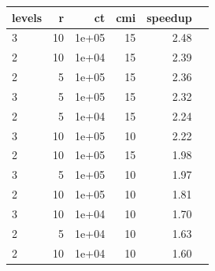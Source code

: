 \begin{tabular}{l|rrrrr}
\hline
levels & r & ct & cmi & speedup \\
\hline
3 & 10 & 1e+05 & 15 & 2.48 \\
2 & 10 & 1e+04 & 15 & 2.39 \\
2 & 5 & 1e+05 & 15 & 2.36 \\
3 & 5 & 1e+05 & 15 & 2.32 \\
2 & 5 & 1e+04 & 15 & 2.24 \\
3 & 10 & 1e+05 & 10 & 2.22 \\
2 & 10 & 1e+05 & 15 & 1.98 \\
3 & 5 & 1e+05 & 10 & 1.97 \\
2 & 10 & 1e+05 & 10 & 1.81 \\
3 & 10 & 1e+04 & 10 & 1.70 \\
2 & 5 & 1e+04 & 10 & 1.63 \\
2 & 10 & 1e+04 & 10 & 1.60 \\
\hline
\end{tabular}
